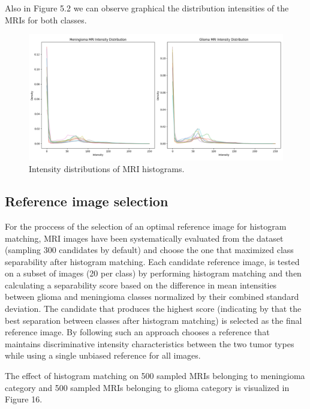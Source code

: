 \documentclass[11pt,a4paper]{article}
\begin{document}
Also in Figure 5.2 we can observe graphical the distribution intensities of the MRIs for both classes.
		\begin{figure}[H]
			\centering
			\includegraphics[width=1.0\textwidth]{images/Unmatched_intensity_distributions.png}
			\caption{Intensity distributions of MRI histograms.}
			\label{fig1:}
		\end{figure}		




\subsection{Reference image selection}

For the proccess of the selection of an optimal reference image for histogram matching, MRI images have been systematically evaluated
from the dataset (sampling 300 candidates by default) and choose the one that maximized class separability after histogram matching.
Each candidate reference image, is tested on a subset of images (20 per class) 
by performing histogram matching and then calculating a separability score based on the 
difference in mean intensities between glioma and meningioma classes 
normalized by their combined standard deviation. The candidate that produces the highest score (indicating by that
the best separation between classes after histogram matching) is selected as the final reference image. 
By following such an approach chooses a reference that maintains discriminative 
intensity characteristics between the two tumor types while using a single unbiased 
reference for all images.

The effect of histogram matching on 500 sampled MRIs belonging to meningioma category and 500 sampled MRIs belonging to glioma category is 
visualized in Figure 16.
\end{document}
